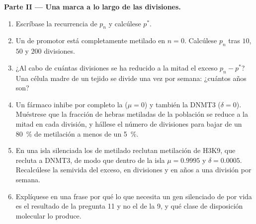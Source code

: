 \begin{problem}
\medskip
\noindent\textbf{Parte II --- Una marca a lo largo de las divisiones.}
\begin{enumerate}[resume]
  \item Escríbase la recurrencia de $p_{n}$ y calcúlese $p^{*}$.
  \item Un  de promotor está completamente metilado en $n = 0$.
        Calcúlese $p_{n}$ tras $10$, $50$ y $200$ divisiones.
  \item ¿Al cabo de cuántas divisiones se ha reducido a la mitad el
        exceso $p_{n} - p^{*}$? Una célula madre de un tejido se divide
        una vez por semana: ¿cuántos años son?
  \item Un fármaco inhibe por completo la  ($\mu = 0$) y también la
        DNMT3 ($\delta = 0$). Muéstrese que la fracción de hebras
        metiladas de la población se reduce a la mitad en cada división,
        y hállese el número de divisiones para bajar de un
        \qty{80}{\%} de metilación a menos de un \qty{5}{\%}.
  \item En una isla silenciada los  de  metilado reclutan
        metilación de H3K9, que recluta a DNMT3, de modo que dentro de la
        isla $\mu = 0.9995$ y $\delta = 0.0005$. Recalcúlese la
        semivida del exceso, en divisiones y en años a una división por
        semana.
  \item Explíquese en una frase por qué lo que necesita un gen silenciado
        de por vida es el resultado de la pregunta 11 y no el de la 9, y
        qué clase de disposición molecular lo produce.
\end{enumerate}


\end{problem}
